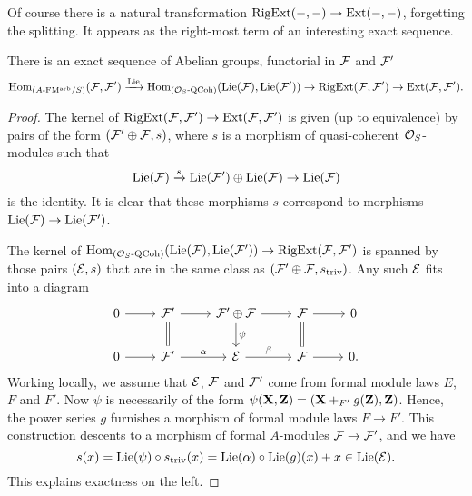 \documentclass[../main.tex]{subfiles}
\begin{document}
Of course there is a natural transformation $\operatorname {RigExt}(-,-) \to \operatorname{Ext}(-,-)$,
forgetting the splitting. It appears as the right-most
term of an interesting exact sequence.
\begin{prop}\label{prop:InterestingES}
  There is an exact sequence of Abelian groups, functorial in
  $\mathcal{F}$ and $\mathcal{F}'$
  \begin{equation*}
    \operatorname{Hom}_{{({A}\text-\allowbreak\mathrm{FM^{arb}}/{S})}}(\mathcal{F}, \mathcal{F}') \xrightarrow{\operatorname{Lie}} \operatorname{Hom}_{{({\mathcal{O}_S}\text-\allowbreak\mathrm{QCoh})}}(\operatorname{Lie}(\mathcal{F}), \operatorname{Lie}(\mathcal{F}'))
    \to \operatorname {RigExt}(\mathcal{F}, \mathcal{F}') \to \operatorname{Ext}(\mathcal{F}, \mathcal{F}'). 
  \end{equation*}
\begin{proof}
  The kernel of $\operatorname {RigExt}(\mathcal{F},\mathcal{F}') \to \operatorname{Ext}(\mathcal{F},\mathcal{F}')$ is given (up to
  equivalence) by 
  pairs of the form $(\mathcal{F}' \oplus \mathcal{F}, s)$, where $s$ is a morphism
  of quasi-coherent $\mathcal{O}_S$-modules such that 
  $$ \operatorname{Lie}(\mathcal{F}) \xrightarrow{s} \operatorname{Lie}(\mathcal{F}') \oplus \operatorname{Lie}(\mathcal{F}) \to  \operatorname{Lie}(\mathcal{F})$$
  is the identity. It is clear that these morphisms $s$ correspond to morphisms 
  $\operatorname{Lie}(\mathcal{F}) \to \operatorname{Lie}(\mathcal{F}')$. 

  The kernel of $\operatorname{Hom}_{{({\mathcal{O}_S}\text-\allowbreak\mathrm{QCoh})}}(\operatorname{Lie}(\mathcal{F}), \operatorname{Lie}(\mathcal{F}')) \to \operatorname {RigExt}(\mathcal{F},
  \mathcal{F}')$ is spanned by those pairs $(\mathcal{E},s)$ that are in the same 
  class as $(\mathcal{F}' \oplus \mathcal{F}, s_{\mathrm{triv}})$. Any such $\mathcal{E}$ fits into
  a diagram 
  \begin{equation*}
    \begin{tikzcd}[ampersand replacement=\&]
    	0 \& {\cF'} \& {\cF' \oplus \cF} \& \cF \& 0 \\
    	0 \& {\cF'} \& \cE \& \cF \& 0.
    	\arrow[from=1-1, to=1-2]
    	\arrow[from=1-2, to=1-3]
    	\arrow[Rightarrow, no head, from=1-2, to=2-2]
    	\arrow[from=1-3, to=1-4]
    	\arrow["\psi", from=1-3, to=2-3]
    	\arrow[from=1-4, to=1-5]
    	\arrow[Rightarrow, no head, from=1-4, to=2-4]
    	\arrow[from=2-1, to=2-2]
    	\arrow["\alpha", from=2-2, to=2-3]
    	\arrow["\beta", from=2-3, to=2-4]
    	\arrow[from=2-4, to=2-5]
    \end{tikzcd}
  \end{equation*}
  Working locally, we assume that $\mathcal{E}$, $\mathcal{F}$ and $\mathcal{F}'$ come from formal 
  module laws $E$, $F$ and $F'$. Now $\psi$ is necessarily of the form
  $\psi(\mathbf{X}, \mathbf{Z}) = (\mathbf{X} +_{F'} g(\mathbf{Z}), \mathbf{Z})$. Hence, the power series
  $g$ furnishes a morphism of formal module laws $F \to F'$. This construction
  descents to a morphism of formal $A$-modules $\mathcal{F} \to \mathcal{F}'$, and we have 
  $$s(x) = \operatorname{Lie}(\psi) \circ s_{\mathrm{triv}}(x) = \operatorname{Lie}(\alpha)\circ\operatorname{Lie}(g)(x)
  + x \in \operatorname{Lie}(\mathcal{E}).$$
  This explains exactness on the left.
\end{proof}
\end{prop}
\end{document}
